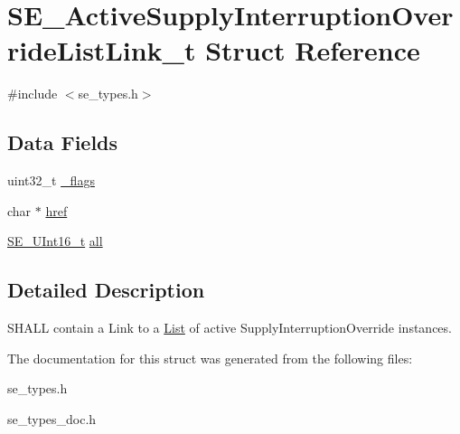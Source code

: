 \hypertarget{structSE__ActiveSupplyInterruptionOverrideListLink__t}{}\section{S\+E\+\_\+\+Active\+Supply\+Interruption\+Override\+List\+Link\+\_\+t Struct Reference}
\label{structSE__ActiveSupplyInterruptionOverrideListLink__t}


{\ttfamily \#include $<$se\+\_\+types.\+h$>$}

\subsection*{Data Fields}
\begin{DoxyCompactItemize}
\item 
uint32\+\_\+t \hyperlink{group__ActiveSupplyInterruptionOverrideListLink_ga677c718c6e02ec5c25394ebb31346416}{\+\_\+flags}
\item 
char $\ast$ \hyperlink{group__ActiveSupplyInterruptionOverrideListLink_gab55929cb1920537dc47faecbc7aff86d}{href}
\item 
\hyperlink{group__UInt16_gac68d541f189538bfd30cfaa712d20d29}{S\+E\+\_\+\+U\+Int16\+\_\+t} \hyperlink{group__ActiveSupplyInterruptionOverrideListLink_ga7e9d6b59a56049d25547596f95b40559}{all}
\end{DoxyCompactItemize}


\subsection{Detailed Description}
S\+H\+A\+LL contain a Link to a \hyperlink{structList}{List} of active Supply\+Interruption\+Override instances. 

The documentation for this struct was generated from the following files\+:\begin{DoxyCompactItemize}
\item 
se\+\_\+types.\+h\item 
se\+\_\+types\+\_\+doc.\+h\end{DoxyCompactItemize}
